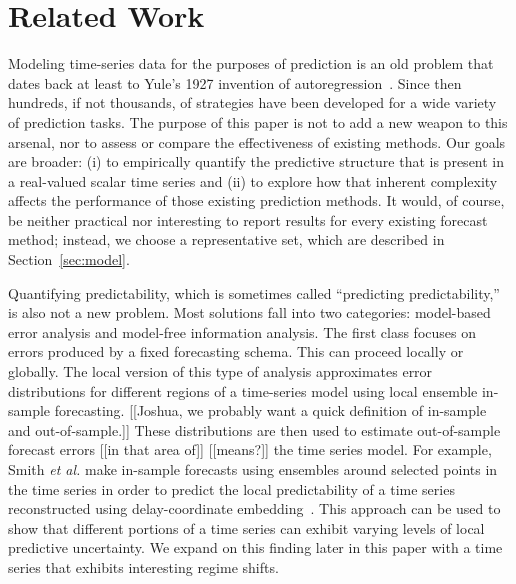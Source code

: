 \section{Related Work }\label{sec:related}

Modeling time-series data for the purposes of prediction is an old
problem that dates back at least to Yule's 1927 invention of
autoregression~\cite{Yule27}.  Since then hundreds, if not thousands,
of strategies have been developed for a wide variety of prediction
tasks.  The purpose of this paper is not to add a new weapon to this
arsenal, nor to assess or compare the effectiveness of existing
methods.  Our goals are broader: (i) to empirically quantify the
predictive structure that is present in a real-valued scalar time
series and (ii) to explore how that inherent complexity affects the
performance of those existing prediction methods.  It would, of
course, be neither practical nor interesting to report results for
every existing forecast method; instead, we choose a representative
set, which are described in Section~\ref{sec:model}.

Quantifying predictability, which is sometimes called ``predicting
predictability,'' is also not a new problem.  Most solutions fall into
two categories: model-based error analysis and model-free information
analysis.
%
%
%
The first class focuses on errors produced by a fixed forecasting
schema.  This can proceed locally or globally.  The local version of
this type of analysis approximates error distributions for different
regions of a time-series model using local ensemble in-sample
forecasting.  {\color{red}[[Joshua, we probably want a quick
      definition of in-sample and out-of-sample.]]} These
distributions are then used to estimate out-of-sample forecast errors
{\color{red}[[in that area of]] [[means?]]} the time series model.
For example, Smith {\sl et al.}  make in-sample forecasts using
ensembles around selected points in the time series in order to
predict the local predictability of a time series reconstructed using
delay-coordinate embedding~\cite{Smith199250}.  This approach can be
used to show that different portions of a time series can exhibit
varying levels of local predictive uncertainty.  We expand on this
finding later in this paper with a time series that exhibits
interesting regime shifts.

